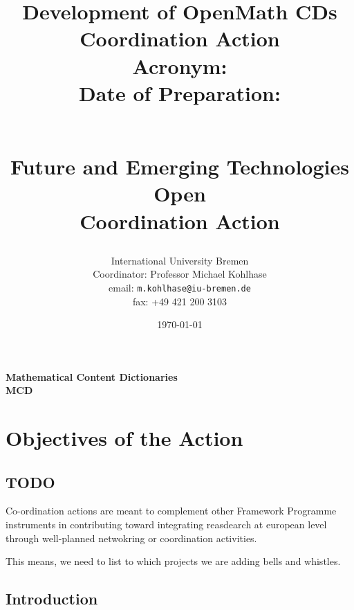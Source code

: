 \documentclass{euproposal}
\begin{document}
\setcounter{part}{2}%


\title{Development of OpenMath CDs Coordination Action\\
  Acronym: \cdca\\
  Date of Preparation: \date{\today} \\
  Future and Emerging Technologies Open\\
  Coordination Action}
\author{International University  Bremen\\
  Coordinator: Professor Michael Kohlhase\\
  email: \texttt{m.kohlhase@iu-bremen.de}\\
  fax: +49 421 200 3103}


\titlepage 
\maketitle

\setcounter{tocdepth}{1}\tableofcontents\newpage
\begin{center}\bf
Mathematical Content Dictionaries\\
MCD
\end{center}
\newpage\setcounter{chapter}{0}

\chapter{Objectives of the Action}


\begin{quote}\sf
\end{quote}

\section*{TODO}
Co-ordination actions are meant to complement other Framework Programme
instruments in contributing toward integrating reasdearch at european level
through well-planned netwokring or coordination activities.

This means, we need to list to which projects we are adding bells and whistles.

\section{Introduction}
\end{document}
